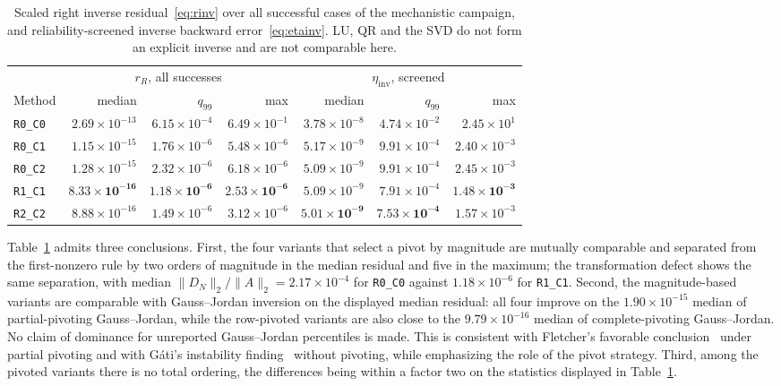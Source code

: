 \documentclass[review,onefignum,onetabnum]{siamart251216}
\begin{document}
\begin{table}
\centering
\caption{Scaled right inverse residual~\eqref{eq:rinv} over all successful cases of the
mechanistic campaign, and reliability-screened inverse backward error~\eqref{eq:etainv}. LU, QR and the SVD
do not form an explicit inverse and are not comparable here.}
\label{tab:comparison}
\footnotesize
\setlength{\tabcolsep}{2.5pt}
\begin{tabular}{lrrrrrr}
\hline
& \multicolumn{3}{c}{$r_R$, all successes} & \multicolumn{3}{c}{$\eta_{\mathrm{inv}}$, screened} \\
\cmidrule(lr){2-4}\cmidrule(lr){5-7}
Method & median & $q_{99}$ & max & median & $q_{99}$ & max \\
\hline
\texttt{R0\_C0} & $2.69\times10^{-13}$ & $6.15\times10^{-4}$ & $6.49\times10^{-1}$
                & $3.78\times10^{-8}$ & $4.74\times10^{-2}$ & $2.45\times10^{1}$ \\
\texttt{R0\_C1} & $1.15\times10^{-15}$ & $1.76\times10^{-6}$ & $5.48\times10^{-6}$
                & $5.17\times10^{-9}$ & $9.91\times10^{-4}$ & $2.40\times10^{-3}$ \\
\texttt{R0\_C2} & $1.28\times10^{-15}$ & $2.32\times10^{-6}$ & $6.18\times10^{-6}$
                & $5.09\times10^{-9}$ & $9.91\times10^{-4}$ & $2.45\times10^{-3}$ \\
\texttt{R1\_C1} & $\mathbf{8.33\times10^{-16}}$ & $\mathbf{1.18\times10^{-6}}$ & $\mathbf{2.53\times10^{-6}}$
                & $5.09\times10^{-9}$ & $7.91\times10^{-4}$ & $\mathbf{1.48\times10^{-3}}$ \\
\texttt{R2\_C2} & $8.88\times10^{-16}$ & $1.49\times10^{-6}$ & $3.12\times10^{-6}$
                & $\mathbf{5.01\times10^{-9}}$ & $\mathbf{7.53\times10^{-4}}$ & $1.57\times10^{-3}$ \\
\hline
\end{tabular}
\end{table}

Table~\ref{tab:comparison} admits three conclusions. First, the four variants that select a pivot
by magnitude are mutually comparable and separated from the first-nonzero rule by two orders of
magnitude in the median residual and five in the maximum; the transformation defect shows the
same separation, with median $\|D_N\|_2/\|A\|_2 = 2.17\times10^{-4}$ for \texttt{R0\_C0} against
$1.18\times10^{-6}$ for \texttt{R1\_C1}. Second, the magnitude-based variants are comparable
with Gauss--Jordan inversion on the displayed median residual: all four improve on the
$1.90\times10^{-15}$ median of partial-pivoting Gauss--Jordan, while the row-pivoted variants are
also close to the $9.79\times10^{-16}$ median of complete-pivoting Gauss--Jordan. No claim of
dominance for unreported Gauss--Jordan percentiles is made. This is consistent with Fletcher's
favorable conclusion~\cite{Fletcher1997} under partial pivoting and with G\'ati's instability
finding~\cite{Gati2013} without pivoting, while emphasizing the role of the pivot strategy.
Third, among the pivoted variants there is no total ordering, the differences being within a
factor two on the statistics displayed in Table~\ref{tab:comparison}.
\end{document}
